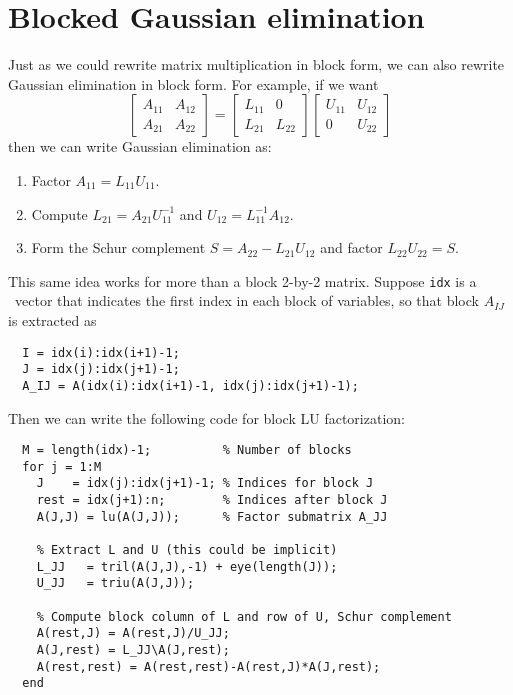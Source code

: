 \section{Blocked Gaussian elimination}
Just as we could rewrite matrix multiplication in block form, we can also
rewrite Gaussian elimination in block form.  For example, if we want
\[
  \begin{bmatrix} A_{11} & A_{12} \\ A_{21} & A_{22} \end{bmatrix} =
  \begin{bmatrix} L_{11} & 0 \\ L_{21} & L_{22} \end{bmatrix}
  \begin{bmatrix} U_{11} & U_{12} \\ 0 & U_{22} \end{bmatrix}
\]
then we can write Gaussian elimination as:
\begin{enumerate}
\item
  Factor $A_{11} = L_{11} U_{11}$.
\item
  Compute $L_{21} = A_{21} U_{11}^{-1}$ and $U_{12} = L_{11}^{-1} A_{12}$.
\item
  Form the Schur complement $S = A_{22} - L_{21} U_{12}$ and factor
  $L_{22} U_{22} = S$.
\end{enumerate}

This same idea works for more than a block 2-by-2 matrix.
Suppose {\tt idx} is a \matlab\ vector that indicates the first index
in each block of variables, so that block $A_{IJ}$ is extracted as
\begin{lstlisting}
  I = idx(i):idx(i+1)-1;
  J = idx(j):idx(j+1)-1;
  A_IJ = A(idx(i):idx(i+1)-1, idx(j):idx(j+1)-1);
\end{lstlisting}
Then we can write the following code for block LU factorization:
\begin{lstlisting}
  M = length(idx)-1;          % Number of blocks
  for j = 1:M
    J    = idx(j):idx(j+1)-1; % Indices for block J
    rest = idx(j+1):n;        % Indices after block J
    A(J,J) = lu(A(J,J));      % Factor submatrix A_JJ

    % Extract L and U (this could be implicit)
    L_JJ   = tril(A(J,J),-1) + eye(length(J));
    U_JJ   = triu(A(J,J));

    % Compute block column of L and row of U, Schur complement
    A(rest,J) = A(rest,J)/U_JJ;
    A(J,rest) = L_JJ\A(J,rest);
    A(rest,rest) = A(rest,rest)-A(rest,J)*A(J,rest);
  end
\end{lstlisting}

